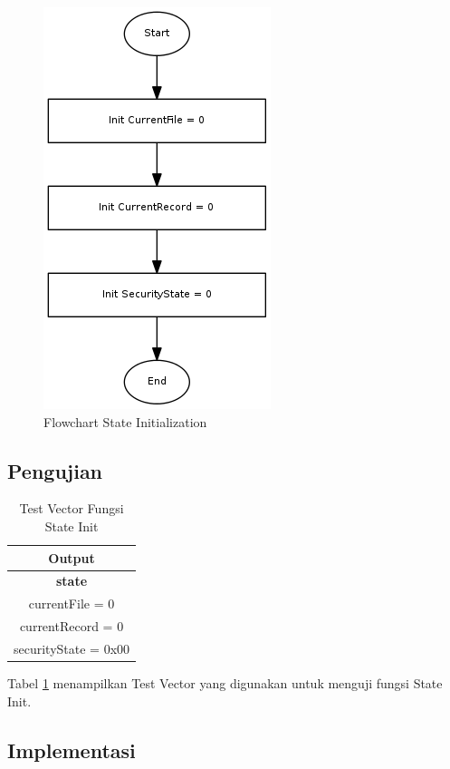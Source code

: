 \begin{figure}[h]
\centering
\includegraphics[height=0.5\textheight]{image/state/flow_stateinit.png}
\caption{Flowchart State Initialization}
\label{fig-flow-stateinit}
\end{figure}

\subsection {Pengujian}

\begin{table}[!h]
  \centering
  \begin{tabular}{ | c | }
    \hline
    \bf{Output} \\
    \hline
    \bf{state} \\
    \hline
    currentFile = 0 \\
    currentRecord = 0 \\
    securityState = 0x00 \\
    \hline
  \end{tabular}
  \caption{Test Vector Fungsi State Init}
  \label{tabel-test-stateinit}
\end{table}

Tabel \ref{tabel-test-stateinit} menampilkan Test Vector yang digunakan untuk menguji fungsi State Init.

\subsection {Implementasi}

